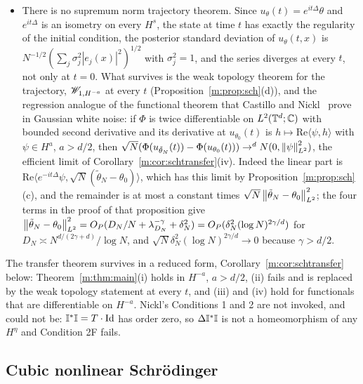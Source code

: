 \begin{itemize}[nosep]
\item There is no supremum norm trajectory theorem. Since $u_\theta(t)=e^{it\Delta}\theta$ and $e^{it\Delta}$ is an isometry on every $H^s$, the state at time $t$ has exactly the regularity of the initial condition, the posterior standard deviation of $u_\theta(t,x)$ is $N^{-1/2}(\sum_j\sigma_j^2|e_j(x)|^2)^{1/2}$ with $\sigma_j^2=1$, and the series diverges at every $t$, not only at $t=0$. What survives is the weak topology theorem for the trajectory, $\mathscr{W}_{1,H^{-a}}$ at every $t$ (Proposition~\ref{m:prop:sch}(d)), and the regression analogue of the functional theorem that Castillo and Nickl~\cite{castillonickl2013} prove in Gaussian white noise: if $\Phi$ is twice differentiable on $L^2(\mathbb{T}^d;\mathbb{C})$ with bounded second derivative and its derivative at $u_{\theta_0}(t)$ is $h\mapsto\mathrm{Re}\langle\psi,h\rangle$ with $\psi\in H^a$, $a>d/2$, then $\sqrt N(\Phi(u_{\tilde\theta_N}(t))-\Phi(u_{\theta_0}(t)))\to^dN(0,\left\|\psi\right\|^2_{L^2})$, the efficient limit of Corollary~\ref{m:cor:schtransfer}(iv). Indeed the linear part is $\mathrm{Re}\langle e^{-it\Delta}\psi,\sqrt N(\tilde\theta_N-\theta_0)\rangle$, which has this limit by Proposition~\ref{m:prop:sch}(c), and the remainder is at most a constant times $\sqrt N\left\|\tilde\theta_N-\theta_0\right\|^2_{L^2}$; the four terms in the proof of that proposition give $\left\|\tilde\theta_N-\theta_0\right\|^2_{L^2}=O_P(D_N/N+\lambda_{D_N}^{-\gamma}+\delta_N^2)=O_P(\delta_N^2(\log N)^{2\gamma/d})$ for $D_N\asymp N^{d/(2\gamma+d)}/\log N$, and $\sqrt N\delta_N^2(\log N)^{2\gamma/d}\to0$ because $\gamma>d/2$.
\end{itemize}
The transfer theorem survives in a reduced form, Corollary~\ref{m:cor:schtransfer} below: Theorem~\ref{m:thm:main}(i) holds in $H^{-a}$, $a>d/2$, (ii) fails and is replaced by the weak topology statement at every $t$, and (iii) and (iv) hold for functionals that are differentiable on $H^{-a}$. Nickl's Conditions 1 and 2 are not invoked, and could not be: $\mathbb{I}^*\mathbb{I}=T\cdot\operatorname{Id}$ has order zero, so $\Delta\mathbb{I}^*\mathbb{I}$ is not a homeomorphism of any $H^\eta$ and Condition 2F fails.

\subsection{Cubic nonlinear Schr\"odinger}

